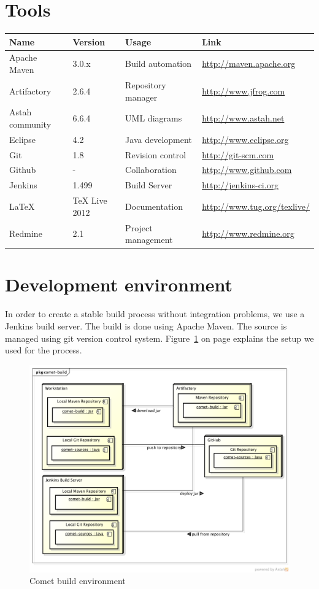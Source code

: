 \documentclass[fontsize=12pt,
               paper=a4,
               twoside=false,
               parskip=half,
               ]{scrartcl}
\begin{document}
\section{Tools}
\begin{tabular}{| l | l | l | l |}
	\hline
	\textbf{Name} & \textbf{Version} & \textbf{Usage} & \textbf{Link} \\ \hline
	Apache Maven & 3.0.x & Build automation & \url{http://maven.apache.org} \\ \hline
	Artifactory & 2.6.4 & Repository manager & \url{http://www.jfrog.com} \\ \hline
	Astah community & 6.6.4 & UML diagrams & \url{http://www.astah.net} \\ \hline
	Eclipse & 4.2 & Java development & \url{http://www.eclipse.org} \\ \hline
	Git & 1.8 & Revision control & \url{http://git-scm.com} \\ \hline
	Github & - & Collaboration & \url{http://www.github.com} \\ \hline
	Jenkins & 1.499 & Build Server & \url{http://jenkins-ci.org} \\ \hline
	LaTeX & TeX Live 2012 & Documentation & \url{http://www.tug.org/texlive/} \\ \hline
	Redmine & 2.1 & Project management & \url{http://www.redmine.org} \\ \hline
\end{tabular}

\section{Development environment}

In order to create a stable build process without integration problems, we use a Jenkins build server. The build is done using Apache Maven. The source is managed using git version control system. Figure~\ref{fig:build_environment} on page \pageref{fig:build_environment} explains the setup we used for the process.

\begin{figure}[h!]
	\includegraphics[width=15.5cm]{./img/comet-build.png}
	\caption[Comet build environment]{Comet build environment}
	\label{fig:build_environment}
\end{figure}
\end{document}
